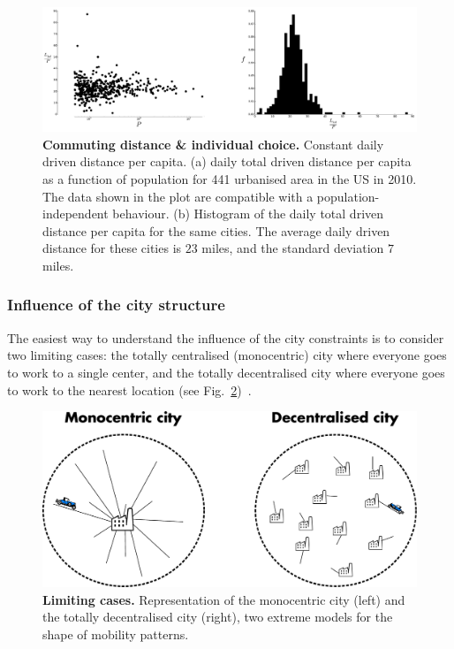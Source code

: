 \begin{figure}[!h]
    \includegraphics[width=1.0\textwidth]{gfx/chapter-scaling/figure_2.pdf}
    \caption{{\bf Commuting distance \& individual choice.} Constant daily driven distance per capita. (a) daily total driven
        distance per capita as a function of population for 441 urbanised area
        in the US in 2010. The data shown in the plot are compatible with a
    population-independent behaviour. (b) Histogram of the daily total driven
distance per capita for the same cities. The average daily driven distance for
these cities is $23$ miles, and the standard deviation $7$ miles.}
\label{fig:LtotoverP} 
\end{figure}



\subsubsection{Influence of the city structure}
\label{sub:influence_of_the_city_structure}

The easiest way to understand the influence of the city constraints is to
consider two limiting cases: the totally centralised
(monocentric) city where everyone goes to work to a single center, and the
totally decentralised city where everyone goes to work to the nearest
location (see Fig.~\ref{fig:monocentric_decentralised})~\cite{Samaniego:2008}.\\

\begin{figure}[!h]
    \centering
    \includegraphics[width=1\textwidth]{gfx/chapter-scaling/monocentric-decentralised.pdf}
    \caption{{\bf Limiting cases.} Representation of the monocentric city (left) and the totally
    decentralised city (right), two extreme models for the shape of mobility
patterns.\label{fig:monocentric_decentralised}}
\end{figure}

